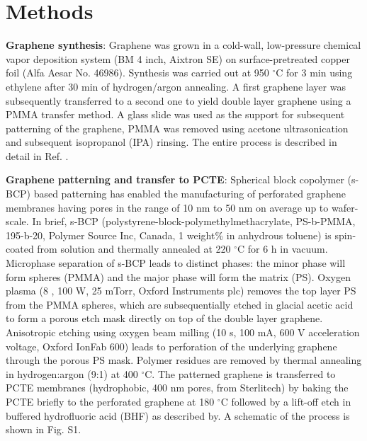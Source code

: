 \documentclass[journal=langd5,email=true, hyperref=true, keywords=false]{achemso}
\newcommand{\Fig}{Fig.}
\begin{document}
\section{Methods}
\label{sec:methods}

\textbf{Graphene synthesis}: Graphene was grown in a cold-wall,
low-pressure chemical vapor deposition system (BM 4 inch, Aixtron SE)
on surface-pretreated copper foil (Alfa Aesar No. 46986). Synthesis was
carried out at 950 $^{\circ}$C for 3 min using ethylene after 30 min of
hydrogen/argon annealing. A first graphene layer was subsequently
transferred to a second one to yield double layer graphene using a
PMMA transfer method. A glass slide was used as the support for
subsequent patterning of the graphene, PMMA was removed using acetone
ultrasonication and subsequent isopropanol (IPA) rinsing. The entire
process is described in detail in Ref. .

\vspace{1em}
\noindent
\textbf{Graphene patterning and transfer to PCTE}: Spherical block
copolymer (s-BCP) based patterning has enabled the manufacturing of
perforated graphene membranes having pores in the range of 10 nm to 50
nm on average up to wafer-scale\cite{Choi_2018}. In brief, s-BCP
(polystyrene-block-polymethylmethacrylate, PS-b-PMMA, 195-b-20,
Polymer Source Inc, Canada, 1 weight\% in anhydrous toluene) is
spin-coated from solution and thermally annealed at 220 $^{\circ}$C
for 6 h in vacuum. Microphase separation of s-BCP leads to distinct
phases: the minor phase will form spheres (PMMA) and the major phase
will form the matrix (PS). Oxygen plasma (8 , 100 W, 25 mTorr, Oxford
Instruments plc) removes the top layer PS from the PMMA spheres, which
are subsequentially etched in glacial acetic acid to form a porous
etch mask directly on top of the double layer graphene. Anisotropic
etching using oxygen beam milling (10 s, 100 mA, 600 V acceleration
voltage, Oxford IonFab 600) leads to perforation of the underlying
graphene through the porous PS mask. Polymer residues are removed by
thermal annealing in hydrogen:argon (9:1) at 400 $^{\circ}$C. The
patterned graphene is transferred to PCTE membranes (hydrophobic, 400
nm pores, from Sterlitech) by baking the PCTE briefly to the
perforated graphene at 180 $^{\circ}$C followed by a lift-off etch in
buffered hydrofluoric acid (BHF) as described by\cite{Choi_2018}. A
schematic of the process is shown in \Fig{} S1.
\end{document}
